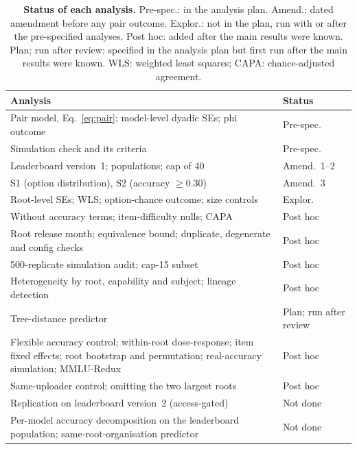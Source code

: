 \documentclass{ieeeaccess}
\theoremstyle{definition}
\theoremstyle{plain}
\begin{document}
\begin{table}[!t]
\caption{\textbf{Status of each analysis.} Pre-spec.: in the analysis plan. Amend.: dated amendment before any pair outcome. Explor.: not in the plan, run with or after the pre-specified analyses. Post hoc: added after the main results were known. Plan; run after review: specified in the analysis plan but first run after the main results were known. WLS: weighted least squares; CAPA: chance-adjusted agreement.}
\label{tab:status}
\centering
\footnotesize
\setlength{\tabcolsep}{3pt}
\begin{tabular}{p{}l}
\toprule
Analysis & Status \\
\midrule
Pair model, Eq.~\eqref{eq:pair}; model-level dyadic SEs; phi outcome & Pre-spec. \\
Simulation check and its criteria & Pre-spec. \\
Leaderboard version~1; populations; cap of 40 & Amend.~1--2 \\
S1 (option distribution), S2 (accuracy $\geq 0.30$) & Amend.~3 \\
Root-level SEs; WLS; option-chance outcome; size controls & Explor. \\
Without accuracy terms; item-difficulty nulls; CAPA & Post hoc \\
Root release month; equivalence bound; duplicate, degenerate and config checks & Post hoc \\
500-replicate simulation audit; cap-15 subset & Post hoc \\
Heterogeneity by root, capability and subject; lineage detection & Post hoc \\
Tree-distance predictor & Plan; run after review \\
Flexible accuracy control; within-root dose-response; item fixed effects; root bootstrap and permutation; real-accuracy simulation; MMLU-Redux & Post hoc \\
Same-uploader control; omitting the two largest roots & Post hoc \\
Replication on leaderboard version~2 (access-gated) & Not done \\
Per-model accuracy decomposition on the leaderboard population; same-root-organisation predictor & Not done \\
\bottomrule
\end{tabular}
\end{table}
\end{document}
